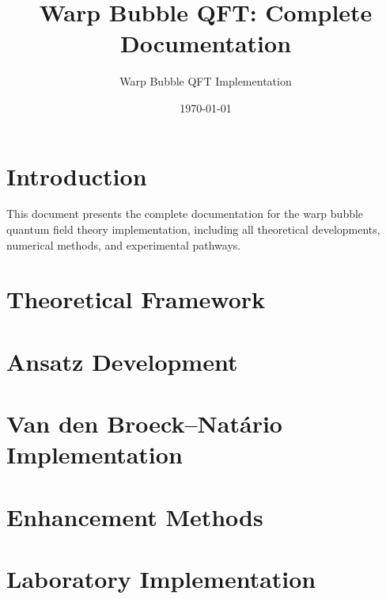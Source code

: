 \documentclass{article}
\title{Warp Bubble QFT: Complete Documentation}
\author{Warp Bubble QFT Implementation}
\date{\today}
\begin{document}
\maketitle

\tableofcontents
\newpage

\section{Introduction}

This document presents the complete documentation for the warp bubble quantum field theory implementation, including all theoretical developments, numerical methods, and experimental pathways.

\section{Theoretical Framework}









\section{Ansatz Development}




\section{Van den Broeck–Natário Implementation}




\section{Enhancement Methods}




\section{Laboratory Implementation}
\end{document}
